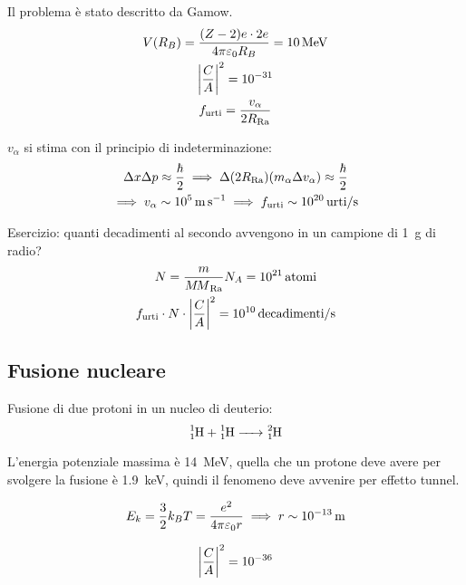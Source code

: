 Il problema è stato descritto da Gamow.
\begin{gather}
    V(R_B) = \frac{(Z - 2)e \cdot 2 e}{4 \pi \eps_0 R_B} = \qty{10}{\mega\electronvolt} \\
    \abs{\frac{C}{A}}^2 = \num{e-31} \\
    f_\text{urti} = \frac{v_\alpha}{2 R_{\ce{Ra}}}
\end{gather}

$v_\alpha$ si stima con il principio di indeterminazione:
\begin{gather}
    \Delta x \Delta p \approx \frac{\hbar}{2}
    \implies
    \Delta (2 R_{\ce{Ra}}) (m_\alpha \Delta v_\alpha) \approx \frac{\hbar}{2} \\
    \implies
    v_\alpha \sim \qty{e5}{\metre\per\second}
    \implies
    f_\text{urti} \sim \qty{e20}{urti\per\second}
\end{gather}

Esercizio: quanti decadimenti al secondo avvengono in un campione di \qty{1}{\gram} di radio?
\begin{gather}
    N = \frac{m}{{M\!M}_{\ce{Ra}}} N_A = \qty{e21}{atomi} \\
    f_\text{urti} \cdot N \cdot \abs{\frac{C}{A}}^2 = \qty{e10}{decadimenti\per\second}
\end{gather}

\subsection{Fusione nucleare}


Fusione di due protoni in un nucleo di deuterio:
\begin{equation}
    \ce{^1_1H + ^1_1H -> ^2_1H}
\end{equation}

L'energia potenziale massima è \qty{14}{\mega\electronvolt}, quella che un protone deve avere per svolgere la fusione è \qty{1.9}{\kilo\electronvolt}, quindi il fenomeno deve avvenire per effetto tunnel.

\begin{equation}
    E_k = \frac{3}{2} k_B T = \frac{e^2}{4 \pi \varepsilon_0 r} \implies r \sim \qty{e-13}{\metre}
\end{equation}

\begin{equation}
    \left\lvert \frac{C}{A} \right\rvert^2 = \num{e-36}
\end{equation}

